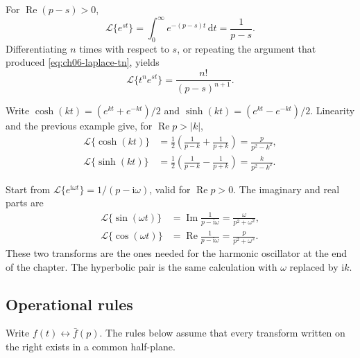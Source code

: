 \begin{example}[Exponentials]
For $\operatorname{Re}(p-s)>0$,
\begin{equation}
\mathcal{L}\{e^{st}\}=\int_0^{\infty}e^{-(p-s)t}\,\mathrm{d}t=\frac{1}{p-s}.
\end{equation}
Differentiating $n$ times with respect to $s$, or repeating the argument that produced \eqref{eq:ch06-laplace-tn}, yields
\begin{equation}
\mathcal{L}\{t^ne^{st}\}=\frac{n!}{(p-s)^{n+1}}.
\end{equation}
\end{example}

\begin{example}
Write $\cosh(kt)=(e^{kt}+e^{-kt})/2$ and $\sinh(kt)=(e^{kt}-e^{-kt})/2$. Linearity and the previous example give, for $\operatorname{Re}p>|k|$,
\begin{align}
\mathcal{L}\{\cosh(kt)\}
&=\frac12\left(\frac{1}{p-k}+\frac{1}{p+k}\right)
=\frac{p}{p^2-k^2},\\
\mathcal{L}\{\sinh(kt)\}
&=\frac12\left(\frac{1}{p-k}-\frac{1}{p+k}\right)
=\frac{k}{p^2-k^2}.
\end{align}
\end{example}

\begin{example}
Start from $\mathcal{L}\{e^{\mathrm{i}\omega t}\}=1/(p-\mathrm{i}\omega)$, valid for $\operatorname{Re}p>0$. The imaginary and real parts are
\begin{align}
\mathcal{L}\{\sin(\omega t)\}
&=\operatorname{Im}\frac{1}{p-\mathrm{i}\omega}
=\frac{\omega}{p^2+\omega^2},\\
\mathcal{L}\{\cos(\omega t)\}
&=\operatorname{Re}\frac{1}{p-\mathrm{i}\omega}
=\frac{p}{p^2+\omega^2}.
\end{align}
These two transforms are the ones needed for the harmonic oscillator at the end of the chapter. The hyperbolic pair is the same calculation with $\omega$ replaced by $\mathrm{i}k$.
\end{example}

\subsection{Operational rules}

Write $f(t)\longleftrightarrow\bar f(p)$. The rules below assume that every transform written on the right exists in a common half-plane.


